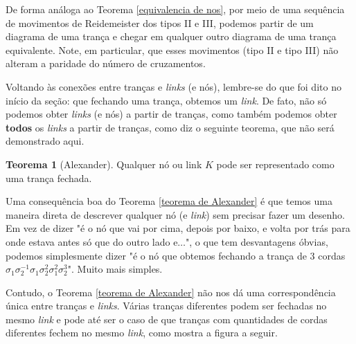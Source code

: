\documentclass[a4paper,portuguese,11pt,twoside, leqno]{book}
\theoremstyle{definition}
\newtheorem{theorem}{Teorema}[section]
\begin{document}
	\par\vspace{0.3cm} De forma análoga ao Teorema \eqref{equivalencia de nos}, por meio de uma sequência de movimentos de Reidemeister dos tipos II e III, podemos partir de um diagrama de uma trança e chegar em qualquer outro diagrama de uma trança equivalente. Note, em particular, que esses movimentos (tipo II e tipo III) não alteram a paridade do número de cruzamentos. 
	\par\vspace{0.3cm} Voltando às conexões entre tranças e \textit{links} (e nós), lembre-se do que foi dito no início da seção: que fechando uma trança, obtemos um \textit{link}. De fato, não só podemos obter \textit{links} (e nós) a partir de tranças, como também podemos obter \textbf{todos} os \textit{links} a partir de tranças, como diz o seguinte teorema, que não será demonstrado aqui.
	
	\begin{theorem}[Alexander]
		\label{teorema de Alexander}
		Qualquer nó ou link $K$ pode ser representado como uma trança fechada.
	\end{theorem}
	
	\par\vspace{0.3cm} Uma consequência boa do Teorema \eqref{teorema de Alexander} é que temos uma maneira direta de descrever qualquer nó (e \textit{link}) sem precisar fazer um desenho. Em vez de dizer "é o nó que vai por cima, depois por baixo, e volta por trás para onde estava antes só que do outro lado e$\dots$", o que tem desvantagens óbvias, podemos simplesmente dizer "é o nó que obtemos fechando a trança de 3 cordas $\sigma_1\sigma_2^{-1}\sigma_1\sigma_2^2\sigma_1^2\sigma_2^3$". Muito mais simples.
	\par\vspace{0.3cm} Contudo, o Teorema \eqref{teorema de Alexander} não nos dá uma correspondência única entre tranças e \textit{links}. Várias tranças diferentes podem ser fechadas no mesmo \textit{link} e pode até ser o caso de que tranças com quantidades de cordas diferentes fechem no mesmo \textit{link}, como mostra a figura a seguir.
	
\end{document}
